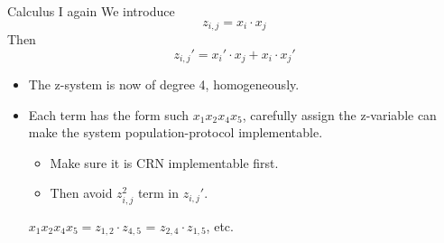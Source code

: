 \documentclass[aspectratio=169]{beamer}
\begin{document}
\begin{frame}[Clean]{Calculus I again}
    We introduce
    \[
        z_{i,j} = x_i \cdot x_j
    \]
    Then
    \[
        z_{i,j}' = x_i' \cdot x_j + x_i \cdot x_j'
    \]
    \begin{itemize}
        \item The z-system is now of degree 4, homogeneously.
        \item Each term has the form such $x_1 x_2 x_4 x_5$, carefully assign the z-variable can make the system population-protocol implementable.
        \begin{itemize}
            \item Make sure it is CRN implementable first.
            \item Then avoid $z_{i,j}^2$ term in $z_{i,j}'$.
        \end{itemize}
     $x_1 x_2 x_4 x_5 = z_{1,2} \cdot z_{4,5}$ = $ z_{2,4}\cdot z_{1,5}$, etc.
    \end{itemize}
\end{frame}
\end{document}
